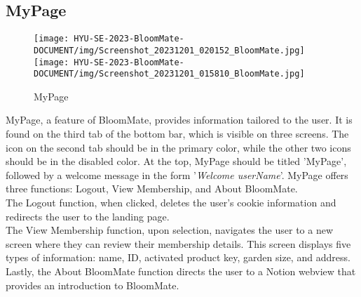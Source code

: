 \documentclass[conference, a4paper]{IEEEtran}
\begin{document}
\subsection{MyPage}
    \begin{figure}[h]
    \centerline{
        \texttt{[image: HYU-SE-2023-BloomMate-DOCUMENT/img/Screenshot\_20231201\_020152\_BloomMate.jpg]}
        \texttt{[image: HYU-SE-2023-BloomMate-DOCUMENT/img/Screenshot\_20231201\_015810\_BloomMate.jpg]}
    }
    \label{fig}
    \caption{MyPage}
    \end{figure}
 MyPage, a feature of BloomMate, provides information tailored to the user. It is found on the third tab of the bottom bar, which is visible on three screens. The icon on the second tab should be in the primary color, while the other two icons should be in the disabled color. At the top, MyPage should be titled 'MyPage', followed by a welcome message in the form '\textit{Welcome userName}'. MyPage offers three functions: Logout, View Membership, and About BloomMate.\\

The Logout function, when clicked, deletes the user's cookie information and redirects the user to the landing page.\\

The View Membership function, upon selection, navigates the user to a new screen where they can review their membership details. This screen displays five types of information: name, ID, activated product key, garden size, and address.\\

Lastly, the About BloomMate function directs the user to a Notion webview that provides an introduction to BloomMate.\\
\end{document}
